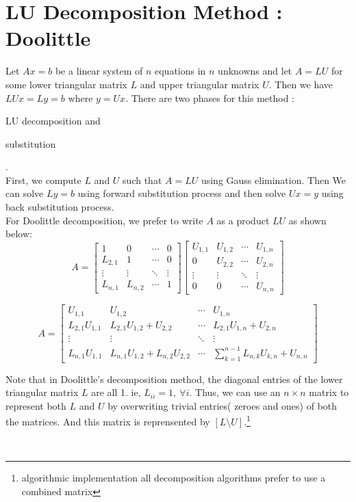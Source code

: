 \section{LU Decomposition Method : Doolittle}
	Let $Ax = b$ be a linear system of $n$ equations in $n$ unknowns and let $A = LU$ for some lower triangular matrix $L$ and upper triangular matrix $U$. Then we have $LUx = Ly = b$ where $y = Ux$. There are two phases for this method : \begin{enumerate*} \item LU decomposition and \item substitution \end{enumerate*}.\\

	First, we compute $L$ and $U$ such that $A = LU$ using Gauss elimination. Then We can solve $Ly = b$ using forward substitution process and then solve $Ux = y$ using back substitution process.\\

	For Doolittle decomposition, we prefer to write $A$ as a product $LU$ as shown below:
	\[ A = \begin{bmatrix} 1 & 0 & \cdots & 0 \\ L_{2,1} & 1 & \cdots & 0 \\ \vdots & \vdots & \ddots & \vdots \\ L_{n,1} & L_{n,2} & \cdots & 1 \end{bmatrix} \begin{bmatrix} U_{1,1} & U_{1,2} & \cdots & U_{1,n} \\ 0 & U_{2,2} & \cdots & U_{2,n} \\ \vdots & \vdots & \ddots & \vdots \\ 0 & 0 & \cdots & U_{n,n} \end{bmatrix} \]

		\[ A = \begin{bmatrix} U_{1,1} & U_{1,2} & \cdots & U_{1,n} \\ L_{2,1}U_{1,1} & L_{2,1}U_{1,2} + U_{2,2} & \cdots & L_{2,1}U_{1,n}+U_{2,n} \\ \vdots & \vdots & \ddots & \vdots \\ L_{n,1}U_{1,1} & L_{n,1}U_{1,2}+L_{n,2}U_{2,2} & \cdots & \sum_{k=1}^{n-1} L_{n,k}U_{k,n}+U_{n,n} \end{bmatrix} \]

	\begin{commentary}Note that in Doolittle's decomposition method, the diagonal entries of the lower triangular matrix $L$ are all 1. ie, $L_{ii} = 1,\ \forall i$. Thus, we can use an $n \times n$ matrix to represent both $L$ and $U$ by overwriting trivial entries( zeroes and ones) of both the matrices. And this matrix is reprensented by $[L\text{\textbackslash{}}U]$.\footnote{algorithmic implementation all decomposition algorithms prefer to use a combined matrix}\end{commentary}\\

